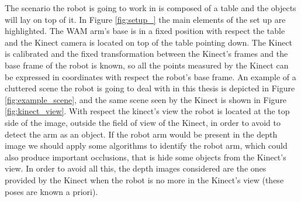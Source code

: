The scenario the robot is going to work in is composed of a table and the objects will lay on top of it. In Figure \ref{fig:setup_} the main elements of the set up are highlighted. The WAM arm's base is in a fixed position with respect the table and the Kinect camera is located on top of the table pointing down. The Kinect is calibrated and the fixed transformation between the Kinect's frames and the base frame of the robot is known, so all the points measured by the Kinect can be expressed in coordinates with respect the robot's base frame. An example of a cluttered scene the robot is going to deal with in this thesis is depicted in Figure \ref{fig:example_scene}, and the same scene seen by the Kinect is shown in Figure \ref{fig:kinect_view}. With respect the kinect's view the robot is located at the top side of the image, outside the field of view of the Kinect, in order to avoid to detect the arm as an object. If the robot arm would be present in the depth image we should apply some algorithms to identify the robot arm, which could also produce important occlusions, that is hide some objects from the Kinect's view. In order to avoid all this, the depth images considered are the ones provided by the Kinect when the robot is no more in the Kinect's view (these poses are known a priori). 

